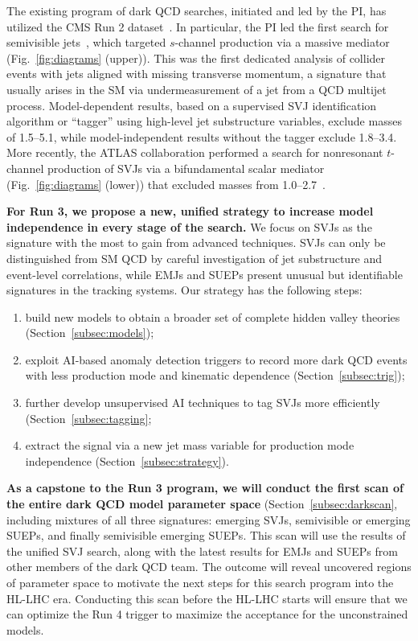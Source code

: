 The existing program of dark QCD searches, initiated and led by the PI, has utilized the CMS Run 2 dataset~\cite{Sirunyan:2018njd,CMS:2021dzg,CMS:2024nca,CMS:2024gxp}.
In particular, the PI led the first search for semivisible jets~\cite{CMS:2021dzg}, which targeted $s$-channel production via a massive \PZprime mediator (Fig.~\ref{fig:diagrams} (upper)).
This was the first dedicated analysis of collider events with jets aligned with missing transverse momentum,
a signature that usually arises in the SM via undermeasurement of a jet from a QCD multijet process.
Model-dependent results, based on a supervised SVJ identification algorithm or ``tagger'' using high-level jet substructure variables, exclude \PZprime masses of 1.5--5.1\TeV,
while model-independent results without the tagger exclude 1.8--3.4\TeV.
More recently, the ATLAS collaboration performed a search for nonresonant $t$-channel production of SVJs via a bifundamental scalar mediator \Pbifun (Fig.~\ref{fig:diagrams} (lower))
that excluded masses from 1.0--2.7\TeV~\cite{ATLAS:2023swa}.

\textbf{For Run 3, we propose a new, unified strategy to increase model independence in every stage of the search.}
We focus on SVJs as the signature with the most to gain from advanced techniques.
SVJs can only be distinguished from SM QCD by careful investigation of jet substructure and event-level correlations,
while EMJs and SUEPs present unusual but identifiable signatures in the tracking systems.
Our strategy has the following steps:
\begin{enumerate}
\item build new models to obtain a broader set of complete hidden valley theories (Section~\ref{subsec:models});
\item exploit AI-based anomaly detection triggers to record more dark QCD events with less production mode and kinematic dependence (Section~\ref{subsec:trig});
\item further develop unsupervised AI techniques to tag SVJs more efficiently (Section~\ref{subsec:tagging};
\item extract the signal via a new jet mass variable for production mode independence (Section~\ref{subsec:strategy}).
\end{enumerate}

\textbf{As a capstone to the Run 3 program, we will conduct the first scan of the entire dark QCD model parameter space} (Section~\ref{subsec:darkscan},
including mixtures of all three signatures: emerging SVJs, semivisible or emerging SUEPs, and finally semivisible emerging SUEPs.
This scan will use the results of the unified SVJ search, along with the latest results for EMJs and SUEPs from other members of the dark QCD team.
The outcome will reveal uncovered regions of parameter space to motivate the next steps for this search program into the HL-LHC era.
Conducting this scan before the HL-LHC starts will ensure that we can optimize the Run 4 trigger to maximize the acceptance for the unconstrained models.

